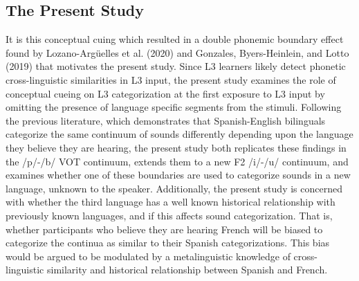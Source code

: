 \documentclass[
  english,
  man]{apa6}
\begin{document}
\hypertarget{the-present-study}{%
\subsection{The Present Study}\label{the-present-study}}

It is this conceptual cuing which resulted in a double phonemic boundary effect found by Lozano-Argüelles et al. (2020) and Gonzales, Byers-Heinlein, and Lotto (2019) that motivates the present study.
Since L3 learners likely detect phonetic cross-linguistic similarities in L3 input, the present study examines the role of conceptual cueing on L3 categorization at the first exposure to L3 input by omitting the presence of language specific segments from the stimuli.
Following the previous literature, which demonstrates that Spanish-English bilinguals categorize the same continuum of sounds differently depending upon the language they believe they are hearing, the present study both replicates these findings in the /p/-/b/ VOT continuum, extends them to a new F2 /i/-/u/ continuum, and examines whether one of these boundaries are used to categorize sounds in a new language, unknown to the speaker. Additionally, the present study is concerned with whether the third language has a well known historical relationship with previously known languages, and if this affects sound categorization. That is, whether participants who believe they are hearing French will be biased to categorize the continua as similar to their Spanish categorizations. This bias would be argued to be modulated by a metalinguistic knowledge of cross-linguistic similarity and historical relationship between Spanish and French.
\end{document}
